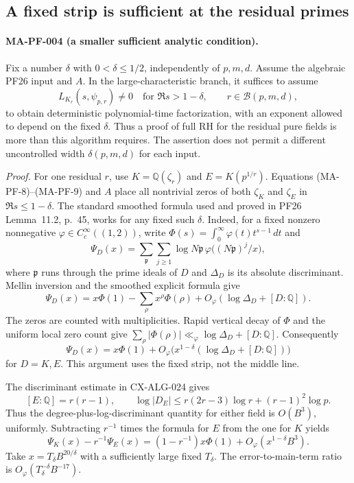 \subsection{A fixed strip is sufficient at the residual primes}

\paragraph{MA-PF-004 (a smaller sufficient analytic condition).}
Fix a number $\delta$ with $0<\delta\le1/2$, independently of
$p,m,d$. Assume the algebraic PF26 input and $A$. In the
large-characteristic branch, it suffices to assume
\[
 L_{K_r}(s,\psi_{p,r})\ne0
       \quad\text{for }\Re s>1-\delta,
       \qquad r\in\mathcal B(p,m,d),
 \tag{MA-PF-9}
\]
to obtain deterministic polynomial-time factorization, with an exponent
allowed to depend on the fixed $\delta$. Thus a proof of full RH for
the residual pure fields is more than this algorithm requires.
The assertion does not permit a different uncontrolled width
$\delta(p,m,d)$ for each input.

\emph{Proof.} For one residual $r$, use $K=\mathbb Q(\zeta_r)$ and
$E=K(p^{1/r})$. Equations (MA-PF-8)--(MA-PF-9) and $A$ place
all nontrivial zeros of both $\zeta_K$ and $\zeta_E$ in
$\Re s\le1-\delta$. The standard smoothed formula used and proved
in PF26 Lemma~11.2, p.~45, works for any fixed such $\delta$.
Indeed, for a fixed nonzero nonnegative
$\varphi\in C_c^\infty((1,2))$, write
$\Phi(s)=\int_0^\infty\varphi(t)t^{s-1}\,dt$ and
\[
 \Psi_D(x)=\sum_{\mathfrak p}\sum_{j\ge1}
       \log N\mathfrak p\,
       \varphi\bigl((N\mathfrak p)^j/x\bigr),
\]
where $\mathfrak p$ runs through the prime ideals of $D$ and
$\Delta_D$ is its absolute discriminant. Mellin inversion and the
smoothed explicit formula give
\[
 \Psi_D(x)=x\Phi(1)-\sum_\rho x^\rho\Phi(\rho)
                       +O_\varphi(\log\Delta_D+[D:\mathbb Q]).
\]
The zeros are counted with multiplicities. Rapid vertical decay of
$\Phi$ and the uniform local zero count give
$\sum_\rho|\Phi(\rho)|\ll_\varphi\log\Delta_D+[D:\mathbb Q]$.
Consequently
\[
 \Psi_D(x)=x\Phi(1)+
 O_\varphi\bigl(x^{1-\delta}
               (\log\Delta_D+[D:\mathbb Q])\bigr)
 \tag{MA-PF-10}
\]
for $D=K,E$. This argument uses the fixed strip, not the middle line.

The discriminant estimate in CX-ALG-024 gives
\[
 [E:\mathbb Q]=r(r-1),\qquad
 \log|D_E|\le r(2r-3)\log r+(r-1)^2\log p.
\]
Thus the degree-plus-log-discriminant quantity for either field is
$O(B^3)$, uniformly. Subtracting $r^{-1}$ times the formula for $E$
from the one for $K$ yields
\[
 \Psi_K(x)-r^{-1}\Psi_E(x)
  =(1-r^{-1})x\Phi(1)+O_\varphi(x^{1-\delta}B^3).
 \tag{MA-PF-11}
\]
Take $x=T_\delta B^{20/\delta}$ with a sufficiently large fixed
$T_\delta$. The error-to-main-term ratio is
$O_\varphi(T_\delta^{-\delta}B^{-17})$.

